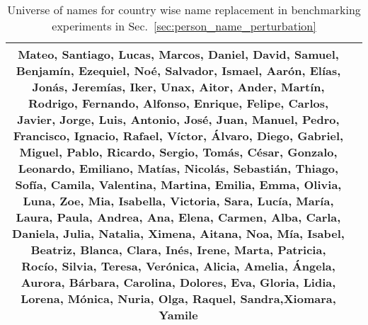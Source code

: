 \begin{table*}[h!]
{\begin{tabular}{|c|p{17cm}|}
    Mateo, Santiago, Lucas, Marcos, Daniel,
    David, Samuel, Benjamín, Ezequiel, Noé,
    Salvador, Ismael, Aarón, Elías, Jonás,
    Jeremías, Iker, Unax, Aitor, Ander,  
    Martín, Rodrigo, Fernando, Alfonso, Enrique,
    Felipe, Carlos, Javier, Jorge, Luis,
    Antonio, José, Juan, Manuel, Pedro,
    Francisco, Ignacio, Rafael, Víctor, Álvaro,
    Diego, Gabriel, Miguel, Pablo, Ricardo,
    Sergio, Tomás, César, Gonzalo, Leonardo,
    Emiliano, Matías, Nicolás, Sebastián, Thiago,   Sofía, Camila, Valentina, Martina, Emilia,
    Emma, Olivia, Luna, Zoe, Mia,
    Isabella, Victoria, Sara, Lucía, María,
    Laura, Paula, Andrea, Ana, Elena,
    Carmen, Alba, Carla, Daniela, Julia,
    Natalia, Ximena, Aitana, Noa, Mía,
    Isabel, Beatriz, Blanca, Clara, Inés,
    Irene, Marta, Patricia, Rocío, Silvia,
    Teresa, Verónica, Alicia, Amelia, Ángela,
    Aurora, Bárbara, Carolina, Dolores, Eva,
    Gloria, Lidia, Lorena, Mónica, Nuria,
    Olga, Raquel, Sandra,Xiomara, Yamile \\

\hline
\end{tabular}}
\caption{Universe of names for country wise name replacement in benchmarking experiments in Sec.~\ref{sec:person_name_perturbation}\label{tab:names_used_benchmark_country_wise}}
\end{table*}




